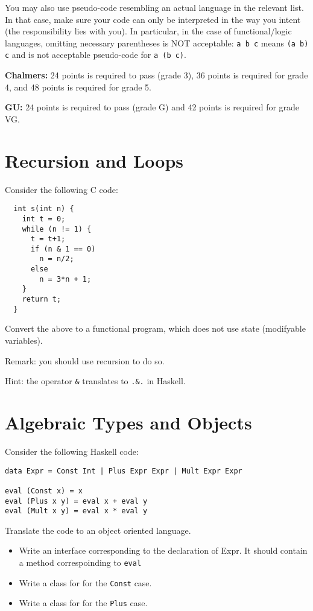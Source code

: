 \documentclass{article}
\begin{document}
You may also use pseudo-code resembling an actual language in the
relevant list. In that case, make sure your code can only be
interpreted in the way you intent (the responsibility lies with
you). In particular, in the case of functional/logic languages,
omitting necessary parentheses is NOT acceptable: \texttt{a b c} means
\texttt{(a b) c} and is not acceptable pseudo-code for \texttt{a (b
  c)}.


\textbf{Chalmers:}
24 points is required to pass (grade 3), 36 points is required for
grade 4, and 48 points is required for grade 5.

\textbf{GU:}
24 points is required to pass (grade G) and 42 points is
required for grade VG.

\section{Recursion and Loops}

Consider the following C code:
\begin{verbatim}
  int s(int n) {
    int t = 0;
    while (n != 1) {
      t = t+1;
      if (n & 1 == 0)
        n = n/2;
      else
        n = 3*n + 1;
    }
    return t;
  }
\end{verbatim}

Convert the above to a functional program, which does not use state (modifyable variables).

Remark: you should use recursion to do so.

Hint: the operator \texttt{\&} translates to \texttt{.\&.} in Haskell.
\section{Algebraic Types and Objects}

Consider the following Haskell code:
\begin{verbatim}
data Expr = Const Int | Plus Expr Expr | Mult Expr Expr

eval (Const x) = x
eval (Plus x y) = eval x + eval y
eval (Mult x y) = eval x * eval y
\end{verbatim}

Translate the code to an object oriented language. 

\begin{itemize}
\item Write an interface corresponding to the declaration of Expr. It should contain a method correspoinding to \texttt{eval} 
\item Write a class for for the \texttt{Const} case. 
\item Write a class for for the \texttt{Plus} case. 
\end{itemize}
\end{document}
